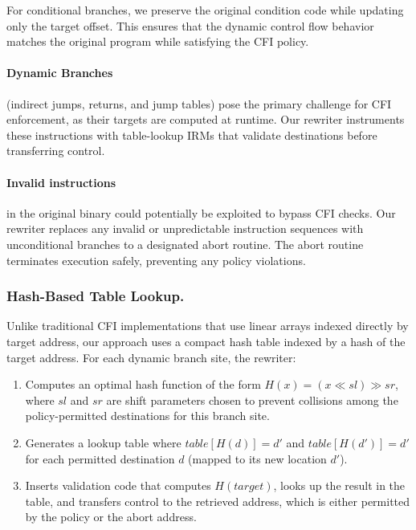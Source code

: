 For conditional branches, we preserve the original condition code while updating only the target offset.
This ensures that the dynamic control flow behavior matches the original program while satisfying the CFI policy.

\paragraph{Dynamic Branches} (\eg indirect jumps, returns, and jump tables) pose the primary challenge for CFI enforcement, as their targets are computed at runtime.
Our rewriter instruments these instructions with table-lookup IRMs that validate destinations before transferring control.

\paragraph{Invalid instructions} in the original binary could potentially be exploited to bypass CFI checks.
Our rewriter replaces any invalid or unpredictable instruction sequences with unconditional branches to a designated abort routine.
The abort routine terminates execution safely, preventing any policy violations.

\subsubsection{Hash-Based Table Lookup.}

Unlike traditional CFI implementations that use linear arrays indexed directly by target address, our approach uses a compact hash table indexed by a hash of the target address.
For each dynamic branch site, the rewriter:

\begin{enumerate}
    \item Computes an optimal hash function of the form $H(x) = (x \ll sl) \gg sr$, where $sl$ and $sr$ are shift parameters chosen to prevent collisions among the policy-permitted destinations for this branch site.
    \item Generates a lookup table where $\mathit{table}[H(d)] = d'$ and $\mathit{table}[H(d')] = d'$ for each permitted destination $d$ (mapped to its new location $d'$).
    \item Inserts validation code that computes $H(\mathit{target})$, looks up the result in the table, and transfers control to the retrieved address, which is either permitted by the policy or the abort address.
\end{enumerate}


